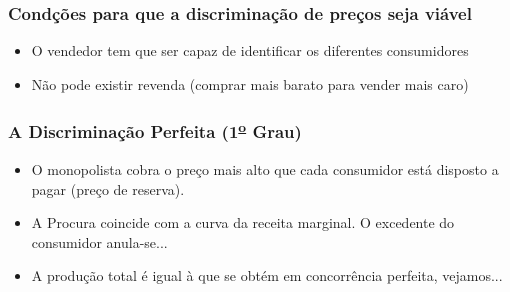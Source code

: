 \begin{frame}
	\frametitle{Cond\c c\~oes para que a discrimina\c c\~ao de pre\c cos seja vi\'avel}
	\begin{itemize}
		\setlength{\itemsep}{1.2em}
		\item O vendedor tem que ser capaz de identificar os diferentes consumidores
		\item N\~ao pode existir revenda (comprar mais barato para vender mais caro)
	\end{itemize}
\end{frame}

\begin{frame}
	\frametitle{A Discrimina\c c\~ao Perfeita (1\textsuperscript{\underline{o}} Grau)}
	\begin{itemize}
		\setlength{\itemsep}{1.5em}
		\item O monopolista cobra o pre\c co mais alto que cada consumidor est\'a disposto a pagar (pre\c co de reserva).
		\item A Procura coincide com a curva da receita marginal. O excedente do consumidor anula-se...
		\item A produ\c c\~ao total \'e igual \`a que se obt\'em em concorr\^encia perfeita, vejamos...
	\end{itemize}
\end{frame}


